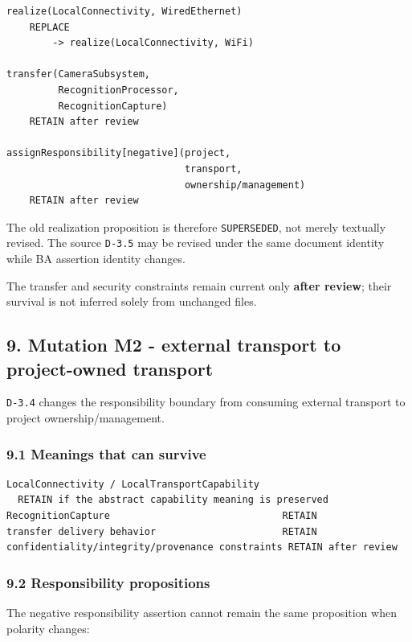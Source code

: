 \documentclass[11pt,a4paper]{article}
\begin{document}
\begin{verbatim}
realize(LocalConnectivity, WiredEthernet)
    REPLACE
        -> realize(LocalConnectivity, WiFi)

transfer(CameraSubsystem,
         RecognitionProcessor,
         RecognitionCapture)
    RETAIN after review

assignResponsibility[negative](project,
                               transport,
                               ownership/management)
    RETAIN after review
\end{verbatim}

The old realization proposition is therefore \texttt{SUPERSEDED}, not
merely textually revised. The source \texttt{D-3.5} may be revised under
the same document identity while BA assertion identity changes.

The transfer and security constraints remain current only \textbf{after
review}; their survival is not inferred solely from unchanged files.

\subsection{9. Mutation M2 - external transport to project-owned
transport}\label{mutation-m2---external-transport-to-project-owned-transport}

\texttt{D-3.4} changes the responsibility boundary from consuming
external transport to project ownership/management.

\subsubsection{9.1 Meanings that can
survive}\label{meanings-that-can-survive}

\begin{verbatim}
LocalConnectivity / LocalTransportCapability
  RETAIN if the abstract capability meaning is preserved
RecognitionCapture                              RETAIN
transfer delivery behavior                      RETAIN
confidentiality/integrity/provenance constraints RETAIN after review
\end{verbatim}

\subsubsection{9.2 Responsibility
propositions}\label{responsibility-propositions}

The negative responsibility assertion cannot remain the same proposition
when polarity changes:
\end{document}
